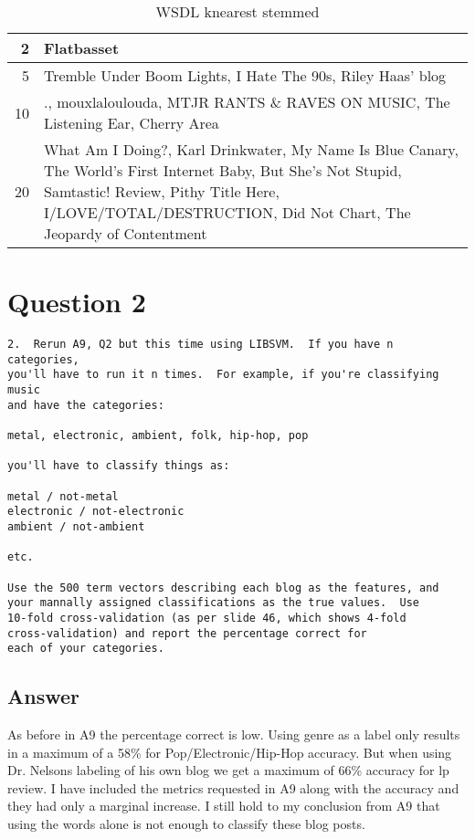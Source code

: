 \documentclass[letterpaper,10pt]{article}
\begin{document}
\begin{table}[H]
\begin{minipage}{0.48\textwidth}
\begin{tabular}{rp{5cm}}
   2 & Flatbasset                                                                                                                                                                                                                  \\ \hline
   5 & Tremble Under Boom Lights, I Hate The 90s, Riley Haas' blog                                                                                                                                                                 \\ \hline
  10 & ., mouxlaloulouda, MTJR RANTS \& RAVES ON MUSIC, The Listening Ear, Cherry Area                                                                                                                                              \\ \hline
  20 & What Am I Doing?, Karl Drinkwater, My Name Is Blue Canary, The World's First Internet Baby, But She's Not Stupid, Samtastic! Review, Pithy Title Here, I/LOVE/TOTAL/DESTRUCTION, Did Not Chart, The Jeopardy of Contentment \\
\hline
\end{tabular}
 \caption{WSDL knearest stemmed} 
 \label{tab:wsldkns} 
\end{minipage}
\end{table}
\newpage
\section*{Question 2}

\begin{verbatim}
2.  Rerun A9, Q2 but this time using LIBSVM.  If you have n categories,
you'll have to run it n times.  For example, if you're classifying music
and have the categories:

metal, electronic, ambient, folk, hip-hop, pop

you'll have to classify things as:

metal / not-metal
electronic / not-electronic
ambient / not-ambient

etc.

Use the 500 term vectors describing each blog as the features, and
your mannally assigned classifications as the true values.  Use
10-fold cross-validation (as per slide 46, which shows 4-fold
cross-validation) and report the percentage correct for 
each of your categories.
\end{verbatim}
\subsection*{Answer}
As before in A9 the percentage correct is low. Using genre as a label only results in a maximum of a 58\% for Pop/Electronic/Hip-Hop accuracy. But when using Dr. Nelsons labeling of his own blog we get a maximum of 66\% accuracy for lp review. I have included the metrics requested in A9 along with the accuracy and they had only a marginal increase. I still hold to my conclusion from A9 that using the words alone is not enough to classify these blog posts. 
\end{document}
